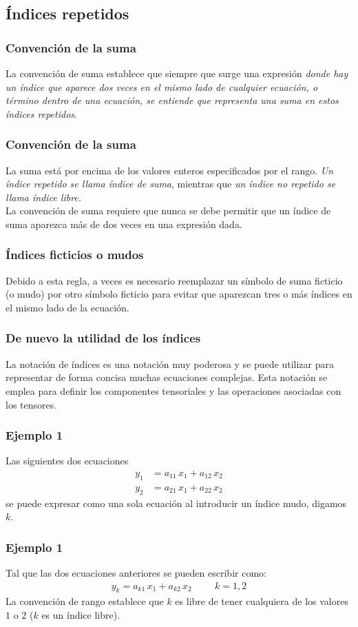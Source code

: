\documentclass[12pt]{beamer}
\begin{document}
\subsection{Índices repetidos}

\begin{frame}
\frametitle{Convención de la suma}
La convención de suma establece que siempre que surge una expresión \emph{donde hay un índice que aparece dos veces en el mismo lado de cualquier ecuación, o término dentro de una ecuación, se entiende que representa una suma en estos índices repetidos}.
\end{frame}
\begin{frame}
\frametitle{Convención de la suma}
La suma está por encima de los valores enteros especificados por el rango. \emph{Un índice repetido se llama índice de suma}, mientras que \emph{un índice no repetido se llama índice libre.}
\\
\bigskip
\pause
La convención de suma requiere que nunca se debe permitir que un índice de suma aparezca más de dos veces en una expresión dada.
\end{frame}
\begin{frame}
\frametitle{Índices ficticios o mudos}
Debido a esta regla, a veces es necesario reemplazar un símbolo de suma ficticio (o mudo) por otro símbolo ficticio para evitar que aparezcan tres o más índices en el mismo lado de la ecuación.
\end{frame}
\begin{frame}
\frametitle{De nuevo la utilidad de los índices}
La notación de índices es una notación muy poderosa y se puede utilizar para representar de forma concisa muchas ecuaciones complejas. Esta notación se emplea para definir los componentes tensoriales y las operaciones asociadas con los tensores.
\end{frame}
\begin{frame}
\frametitle{Ejemplo 1}
Las siguientes dos ecuaciones
\begin{align*}
y_{1} &= a_{11} \, x_{1} + a_{12} \, x_{2} \\[0.5em]
y_{2} &= a_{21} \, x_{1} + a_{22} \, x_{2}
\end{align*}
se puede expresar como una sola ecuación al introducir un índice mudo, digamos $k$.
\end{frame}
\begin{frame}
\frametitle{Ejemplo 1}
Tal que las dos ecuaciones anteriores se pueden escribir como:
\begin{align*}
y_{k} = a_{k1} \, x_{1} + a_{k2} \, x_{2} \hspace{1cm} k = 1, 2
\end{align*}
La convención de rango establece que $k$ es libre de tener cualquiera de los valores $1$ o $2$ ($k$ es un índice libre).
\end{frame}
\end{document}
